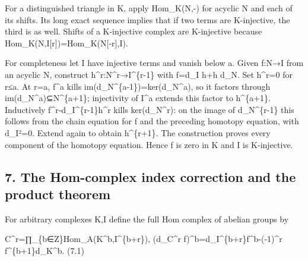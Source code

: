 For a distinguished triangle in K,\allowbreak{} apply Hom\_\allowbreak{}K(N,\allowbreak{}-)\allowbreak{} for acyclic N and each of its shifts. Its long exact sequence implies that if two terms are K-injective,\allowbreak{} the third is as well. Shifts of a K-injective complex are K-injective because Hom\_\allowbreak{}K(N,\allowbreak{}I[r]\allowbreak{})\allowbreak{}\allowbreak{}=Hom\_\allowbreak{}K(N[-r]\allowbreak{},\allowbreak{}I)\allowbreak{}.

For completeness let I have injective terms and vanish below a. Given f:\allowbreak{}N\allowbreak{}→I from an acyclic N,\allowbreak{} construct h\textasciicircum{}r:\allowbreak{}N\textasciicircum{}r\allowbreak{}→I\textasciicircum{}\{r-1\} with f\allowbreak{}=d\_\allowbreak{}I h\allowbreak{}+h d\_\allowbreak{}N. Set h\textasciicircum{}r\allowbreak{}=0 for r≤a. At r\allowbreak{}=a,\allowbreak{} f\^{}a kills im(d\_\allowbreak{}N\textasciicircum{}\{a-1\})\allowbreak{}\allowbreak{}=ker(d\_\allowbreak{}N\textasciicircum{}a)\allowbreak{},\allowbreak{} so it factors through im(d\_\allowbreak{}N\textasciicircum{}a)\allowbreak{}⊆N\textasciicircum{}\{a\allowbreak{}+1\}; injectivity of I\^{}a extends this factor to h\textasciicircum{}\{a\allowbreak{}+1\}. Inductively f\textasciicircum{}r-d\_\allowbreak{}I\textasciicircum{}\{r-1\}h\textasciicircum{}r kills ker(d\_\allowbreak{}N\textasciicircum{}r)\allowbreak{}:\allowbreak{} on the image of d\_\allowbreak{}N\textasciicircum{}\{r-1\} this follows from the chain equation for f and the preceding homotopy equation,\allowbreak{} with d\_\allowbreak{}I²\allowbreak{}=0. Extend again to obtain h\textasciicircum{}\{r\allowbreak{}+1\}. The construction proves every component of the homotopy equation. Hence f is zero in K and I is K-injective.

\subsection{7. The Hom-complex index correction and the product theorem}\label{proofs-9206-9744-the-hom-complex-index-correction-and-the-product-theorem}

For arbitrary complexes K,\allowbreak{}I define the full Hom complex of abelian groups by

C\textasciicircum{}r\allowbreak{}=∏\_\allowbreak{}\{b\allowbreak{}∈Z\}Hom\_\allowbreak{}A(K\textasciicircum{}b,\allowbreak{}I\textasciicircum{}\{b\allowbreak{}+r\})\allowbreak{},\allowbreak{} (d\_\allowbreak{}C\textasciicircum{}r f)\allowbreak{}\textasciicircum{}b\allowbreak{}=d\_\allowbreak{}I\textasciicircum{}\{b\allowbreak{}+r\}f\textasciicircum{}b-(-1)\allowbreak{}\textasciicircum{}r f\textasciicircum{}\{b\allowbreak{}+1\}d\_\allowbreak{}K\textasciicircum{}b. (7.1)\allowbreak{}


